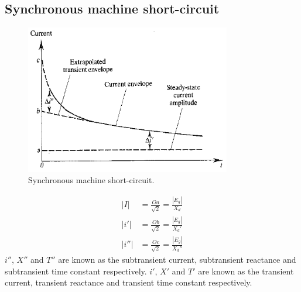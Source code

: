 \subsection{Synchronous machine short-circuit}
\begin{figure}[H]
    \centering
    \includegraphics[width = 0.8\textwidth]{img/figure89.png}
    \caption{Synchronous machine short-circuit.}
\end{figure}
\begin{align}
    \left| I \right|   & = \frac{Oa}{\sqrt{2}} = \frac{\left|E_g\right|}{X_d}   \\
    \left| i' \right|  & = \frac{Ob}{\sqrt{2}} = \frac{\left|E_g\right|}{X_d'}  \\
    \left| i'' \right| & = \frac{Oc}{\sqrt{2}} = \frac{\left|E_g\right|}{X_d''}
\end{align}
$i''$, $X''$ and $T''$ are known as the subtransient current, subtransient reactance and subtransient time constant respectively. $i'$, $X'$ and $T'$ are known as the transient current, transient reactance and transient time constant respectively.
